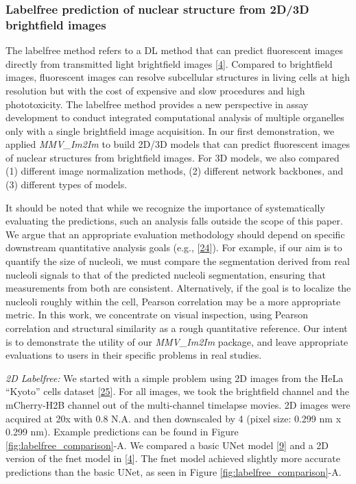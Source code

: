 \hypertarget{labelfree-prediction-of-nuclear-structure-from-2d3d-brightfield-images}{%
\subsubsection{Labelfree prediction of nuclear structure from 2D/3D brightfield images}\label{labelfree-prediction-of-nuclear-structure-from-2d3d-brightfield-images}}

The labelfree method refers to a DL method that can predict fluorescent images directly from transmitted light brightfield images {[}\protect\hyperlink{ref-Yq8wZ6hc}{4}{]}. Compared to brightfield images, fluorescent images can resolve subcellular structures in living cells at high resolution but with the cost of expensive and slow procedures and high phototoxicity. The labelfree method provides a new perspective in assay development to conduct integrated computational analysis of multiple organelles only with a single brightfield image acquisition. In our first demonstration, we applied \emph{MMV\_Im2Im} to build 2D/3D models that can predict fluorescent images of nuclear structures from brightfield images. For 3D models, we also compared (1) different image normalization methods, (2) different network backbones, and (3) different types of models.

It should be noted that while we recognize the importance of systematically evaluating the predictions, such an analysis falls outside the scope of this paper. We argue that an appropriate evaluation methodology should depend on specific downstream quantitative analysis goals (e.g., {[}\protect\hyperlink{ref-C2iqR6xE}{24}{]}). For example, if our aim is to quantify the size of nucleoli, we must compare the segmentation derived from real nucleoli signals to that of the predicted nucleoli segmentation, ensuring that measurements from both are consistent. Alternatively, if the goal is to localize the nucleoli roughly within the cell, Pearson correlation may be a more appropriate metric. In this work, we concentrate on visual inspection, using Pearson correlation and structural similarity as a rough quantitative reference. Our intent is to demonstrate the utility of our \emph{MMV\_Im2Im} package, and leave appropriate evaluations to users in their specific problems in real studies.

\emph{2D Labelfree:} We started with a simple problem using 2D images from the HeLa ``Kyoto'' cells dataset {[}\protect\hyperlink{ref-xv2VIyRP}{25}{]}. For all images, we took the brightfield channel and the mCherry-H2B channel out of the multi-channel timelapse movies. 2D images were acquired at 20x with 0.8 N.A. and then downscaled by 4 (pixel size: 0.299 nm x 0.299 nm). Example predictions can be found in Figure \ref{fig:labelfree_comparison}-A. We compared a basic UNet model {[}\protect\hyperlink{ref-TutLhFSz}{9}{]} and a 2D version of the fnet model in {[}\protect\hyperlink{ref-Yq8wZ6hc}{4}{]}. The fnet model achieved slightly more accurate predictions than the basic UNet, as seen in Figure \ref{fig:labelfree_comparison}-A.

